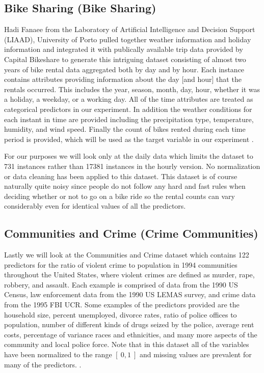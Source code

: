 \documentclass[9pt, conference]{IEEEtran}
\begin{document}
\subsection{Bike Sharing (Bike Sharing)}
Hadi Fanaee from the Laboratory of Artificial Intelligence and Decision Support (LIAAD), University of Porto pulled together weather information and holiday information and integrated it with publically available trip data provided by Capital Bikeshare to generate this intriguing dataset consisting of almost two years of bike rental data aggregated both by day and by hour. Each instance contains attributes providing information about the day [and hour] that the rentals occurred. This includes the year, season, month, day, hour, whether it was a holiday, a weekday, or a working day. All of the time attributes are treated as categorical predictors in our experiment. In addition the weather conditions for each instant in time are provided including the precipitation type, temperature, humidity, and wind speed. Finally the count of bikes rented during each time period is provided, which will be used as the target variable in our experiment \cite{bikeSharingDataset} \cite{bikeSharingCiteRequest}. 

For our purposes we will look only at the daily data which limits the dataset to 731 instances rather than 17381 instances in the hourly version. No normalization or data cleaning has been applied to this dataset. This dataset is of course naturally quite noisy since people do not follow any hard and fast rules when deciding whether or not to go on a bike ride so the rental counts can vary considerably even for identical values of all the predictors.

\subsection{Communities and Crime (Crime Communities)}
Lastly we will look at the Communities and Crime dataset which contains 122 predictors for the ratio of violent crime to population in 1994 communities throughout the United States, where violent crimes are defined as murder, rape, robbery, and assault. Each example is comprised of data from the 1990 US Census, law enforcement data from the 1990 US LEMAS survey, and crime 
data from the 1995 FBI UCR. Some examples of the predictors provided are the household size, percent unemployed, divorce rates, ratio of police offices to population, number of different kinds of drugs seized by the police, average rent costs, percentage of variance races and ethnicities, and many more aspects of the community and local police force. Note that in this dataset all of the variables have been normalized to the range \([\ 0, 1\ ]\) and missing values are prevalent for many of the predictors. \cite{crimeCommunitiesDataset} \cite{crimeCommunitiesCiteRequest1} \cite{crimeCommunitiesCiteRequest2} \cite{crimeCommunitiesCiteRequest3} \cite{crimeCommunitiesCiteRequest4} \cite{crimeCommunitiesCiteRequest5}.
\end{document}
